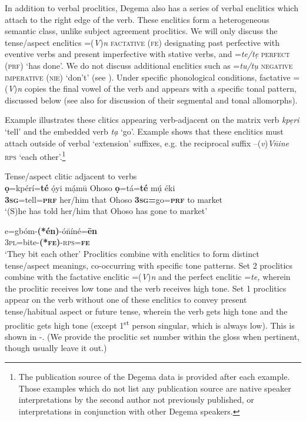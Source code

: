 \documentclass[output=paper]{langsci/langscibook}
\begin{document}
In addition to verbal proclitics, Degema also has a series of verbal enclitics which attach to the right edge of the verb. These enclitics form a heterogeneous semantic class, unlike subject agreement proclitics. We will only discuss the tense/aspect enclitics =(\textit{V})\textit{n} \textsc{factative (fe)} designating past perfective with eventive verbs and present imperfective with stative verbs, and =\textit{te/tẹ} \textsc{perfect} (\textsc{prf}) ‘has done’. We do not discuss additional enclitics such as =\textit{tu/tụ} \textsc{negative imperative (nie)} ‘don’t’ (see \citealt{Kari2004}). Under specific phonological conditions, factative =(\textit{V})\textit{n} copies the final vowel of the verb and appears with a specific tonal pattern, discussed below (see also \citealt[340-342]{Kari2004}  for discussion of their segmental and tonal allomorphs).   

Example  illustrates these clitics appearing verb-adjacent on the matrix verb \textit{kpẹri} ‘tell’ and the embedded verb \textit{tạ} ‘go’. Example  shows that these enclitics must attach outside of verbal ‘extension’ suffixes, e.g. the reciprocal suffix –(\textit{v})\textit{V\={n}ine} \textsc{rps} ‘each other’.\footnote{The publication source of the Degema data is provided after each example. Those examples which do not list any publication source are native speaker interpretations by the second author not previously published, or interpretations in conjunction with other Degema speakers. 
}


\ea
{Tense/aspect clitic adjacent to verbs}\\
   \ea\label{ex:rolle:1}
\gll   \textbf{ọ}=kpérí=\textbf{té}   ọ́yi     mạ́mū   Ohoso   \textbf{ọ}=tá=\textbf{té}     mụ́  éki\\
      \textbf{3}\textbf{\textsc{sg}}=tell=\textbf{\textsc{prf}}   her/him  that     Ohoso  \textbf{3}\textbf{\textsc{sg}}\textbf{=}go=\textbf{\textsc{prf}}  to  market\\
\glt   ‘(S)he has told her/him that Ohoso has gone to market’ \citep[63]{Kari2004}

\ex\label{ex:rolle:2}
\gll   e=gbóm-\textbf{(*én)}{}-ó\={n}íné=\textbf{ēn}\\
       3\textsc{pl}=bite-\textbf{(*}\textbf{\textsc{fe}}\textbf{)}{}-\textsc{rps}=\textbf{\textsc{fe}}\\
\glt   ‘They bit each other’ \citep[149]{Kari2004}
\z
\z 
Proclitics combine with enclitics to form distinct tense/aspect meanings, co-occurring with specific tone patterns. Set 2 proclitics combine with the factative enclitic =(\textit{V})\textit{n} and the perfect enclitic =\textit{te,} wherein the proclitic receives low tone and the verb receives high tone. Set 1 proclitics appear on the verb without one of these enclitics to convey present tense/habitual aspect or future tense, wherein the verb gets high tone and the proclitic gets high tone (except 1\textsuperscript{st} person singular, which is always low). This is shown in -. (We provide the proclitic set number within the gloss when pertinent, though usually leave it out.)
\end{document}
